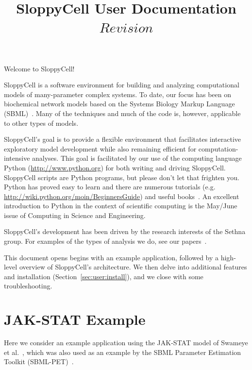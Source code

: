 \documentclass[12pt]{article}
\begin{document}
\title{SloppyCell User Documentation\\
\large$Revision$}
\maketitle
\tableofcontents
\clearpage

Welcome to SloppyCell!

SloppyCell is a software environment for building and analyzing computational models of many-parameter complex systems.
To date, our focus has been on biochemical network models based on the Systems Biology Markup Language (SBML)~\cite{bib:Hucka2003}.
Many of the techniques and much of the code is, however, applicable to other types of models.

SloppyCell's goal is to provide a flexible environment that facilitates interactive exploratory model development while also remaining efficient for computation-intensive analyses.
This goal is facilitated by our use of the computing language Python (\url{http://www.python.org}) for both writing and driving SloppyCell.
SloppyCell scripts are Python programs, but please don't let that frighten you.
Python has proved easy to learn and there are numerous tutorials (e.g. \url{http://wiki.python.org/moin/BeginnersGuide}) and useful books~\cite{bib:Lutz2003}.
An excellent introduction to Python in the context of scientific computing is the May/June issue of Computing in Science and Engineering.

SloppyCell's development has been driven by the research interests of the Sethna group. For examples of the types of analysis we do, see our papers~\cite{bib:Brown2003a, bib:Brown2004, bib:Frederiksen2004, bib:Waterfall2006, bib:Casey2007, bib:Gutenkunst2007, bib:Gutenkunst2007a, bib:GutenkunstPhD}.

This document opens begins with an example application, followed by a high-level overview of SloppyCell's architecture.
We then delve into additional features and installation (Section~\ref{sec:user:install}), and we close with some troubleshooting.

\section{JAK-STAT Example\label{sec:user:example}}

Here we consider an example application using the JAK-STAT model of Swameye et al.~\cite{bib:Swameye2003}, which was also used as an example by the SBML Parameter Estimation Toolkit (SBML-PET)~\cite{bib:Zi2006}.
\end{document}

